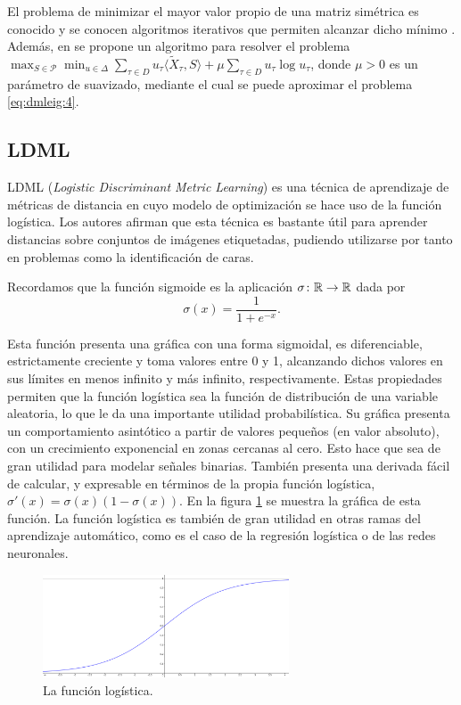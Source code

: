 El problema de minimizar el mayor valor propio de una matriz simétrica es conocido y se conocen algoritmos iterativos que permiten alcanzar dicho mínimo \cite{overton1988minimizing}. Además, en \cite{dmleig} se propone un algoritmo para resolver el problema $\max_{S \in \mathcal{P}} \min_{u \in \Delta} \sum_{\tau \in D} u_{\tau}\langle \widetilde{X}_{\tau},S\rangle + \mu \sum_{\tau \in D} u_{\tau} \log u_{\tau}$, donde $\mu > 0$ es un parámetro de suavizado, mediante el cual se puede aproximar el problema \ref{eq:dmleig:4}.





\subsection{LDML}

LDML (\emph{Logistic Discriminant Metric Learning}) \cite{ldml} es una técnica de aprendizaje de métricas de distancia en cuyo modelo de optimización se hace uso de la función logística. Los autores afirman que esta técnica es bastante útil para aprender distancias sobre conjuntos de imágenes etiquetadas, pudiendo utilizarse por tanto en problemas como la identificación de caras.

Recordamos que la función sigmoide es la aplicación $\sigma\colon \mathbb{R} \to \mathbb{R}$ dada por
\[ \sigma(x) = \frac{1}{1+e^{-x}}. \]

Esta función presenta una gráfica con una forma sigmoidal, es diferenciable, estrictamente creciente y toma valores entre 0 y 1, alcanzando dichos valores en sus límites en menos infinito y más infinito, respectivamente. Estas propiedades permiten que la función logística sea la función de distribución de una variable aleatoria, lo que le da una importante utilidad probabilística. Su gráfica presenta  un comportamiento asintótico a partir de valores pequeños (en valor absoluto), con un crecimiento exponencial en zonas cercanas al cero. Esto hace que sea de gran utilidad para modelar señales binarias. También presenta una derivada fácil de calcular, y expresable en términos de la propia función logística, $\sigma'(x) = \sigma(x)(1-\sigma(x))$. En la figura \ref{fig:funcion_logistica} se muestra la gráfica de esta función. La función logística es también de gran utilidad en otras ramas del aprendizaje automático, como es el caso de la regresión logística o de las redes neuronales.

\begin{figure}[h]
    \centering
    \includegraphics[width=0.65\textwidth]{images/logistica.png}
    \caption{La función logística.} \label{fig:funcion_logistica}
\end{figure}

